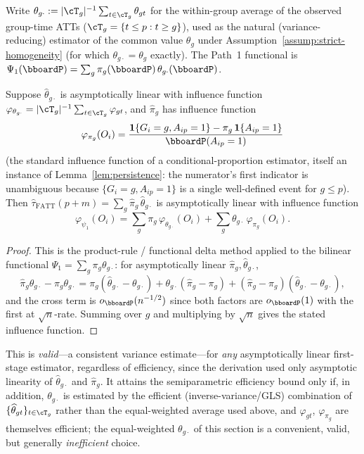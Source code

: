 \documentclass{article}
\renewcommand{\P}{\bboardP}
\begin{document}
Write $\theta_{g\cdot} := |\cT_g|^{-1}\sum_{t\in\cT_g}\theta_{gt}$ for the within-group average of the observed group-time ATTs ($\cT_g = \{t\leq p : t\geq g\}$), used as the natural (variance-reducing) estimator of the common value $\theta_g$ under Assumption~\ref{assump:strict-homogeneity} (for which $\theta_{g\cdot}=\theta_g$ exactly). The Path~1 functional is $\Psi_1(\P) = \sum_g \pi_g(\P)\,\theta_{g\cdot}(\P)$.

\begin{proposition}
\label{prop:eif1}
Suppose $\widehat\theta_{g\cdot}$ is asymptotically linear with influence function $\varphi_{\theta_{g\cdot}} = |\cT_g|^{-1}\sum_{t\in\cT_g}\varphi_{gt}$, and $\widehat\pi_g$ has influence function
\[
\varphi_{\pi_g}(O_i) = \frac{\mathbf{1}\{G_i=g, A_{ip}=1\} - \pi_g\,\mathbf{1}\{A_{ip}=1\}}{\P(A_{ip}=1)}
\]
(the standard influence function of a conditional-proportion estimator, itself an instance of Lemma~\ref{lem:persistence}: the numerator's first indicator is unambiguous because $\{G_i=g,A_{ip}=1\}$ is a single well-defined event for $g\leq p$). Then $\widehat\tau_{\mathrm{FATT}}(p+m) = \sum_g \widehat\pi_g\,\widehat\theta_{g\cdot}$ is asymptotically linear with influence function
\[
\varphi_{\psi_1}(O_i) = \sum_g \pi_g\,\varphi_{\theta_{g\cdot}}(O_i) + \sum_g \theta_{g\cdot}\,\varphi_{\pi_g}(O_i).
\]
\end{proposition}

\begin{proof}
This is the product-rule / functional delta method applied to the bilinear functional $\Psi_1 = \sum_g \pi_g\theta_{g\cdot}$: for asymptotically linear $\widehat\pi_g,\widehat\theta_{g\cdot}$,
\[
\widehat\pi_g\widehat\theta_{g\cdot} - \pi_g\theta_{g\cdot} = \pi_g(\widehat\theta_{g\cdot}-\theta_{g\cdot}) + \theta_{g\cdot}(\widehat\pi_g-\pi_g) + (\widehat\pi_g-\pi_g)(\widehat\theta_{g\cdot}-\theta_{g\cdot}),
\]
and the cross term is $o_\P(n^{-1/2})$ since both factors are $o_\P(1)$ with the first at $\sqrt n$-rate. Summing over $g$ and multiplying by $\sqrt n$ gives the stated influence function.
\end{proof}

\begin{remark}
This is \emph{valid}---a consistent variance estimate---for \emph{any} asymptotically linear first-stage estimator, regardless of efficiency, since the derivation used only asymptotic linearity of $\widehat\theta_{g\cdot}$ and $\widehat\pi_g$. It attains the semiparametric efficiency bound only if, in addition, $\theta_{g\cdot}$ is estimated by the efficient (inverse-variance/GLS) combination of $\{\widehat\theta_{gt}\}_{t\in\cT_g}$ rather than the equal-weighted average used above, and $\varphi_{gt}$, $\varphi_{\pi_g}$ are themselves efficient; the equal-weighted $\theta_{g\cdot}$ of this section is a convenient, valid, but generally \emph{inefficient} choice.
\end{remark}
\end{document}
